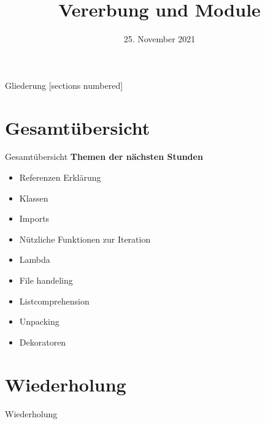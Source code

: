 



\title{Vererbung und Module}
\date{25. November 2021}


	
\maketitle

\begin{frame}{Gliederung}
	[sections numbered]
	\tableofcontents
\end{frame}

\section*{Gesamtübersicht}
\begin{frame}{Gesamtübersicht}
	\textbf{Themen der nächsten Stunden}
	\begin{itemize}
		\item Referenzen Erklärung
		\item  \alert{Klassen}
		\item \alert{Imports}
		\item Nützliche Funktionen zur Iteration
		\item Lambda
		\item File handeling
		\item Listcomprehension
		\item Unpacking
		\item Dekoratoren
	\end{itemize}
\end{frame}

\section{Wiederholung}
\begin{frame}{Wiederholung}
	
\end{frame}


